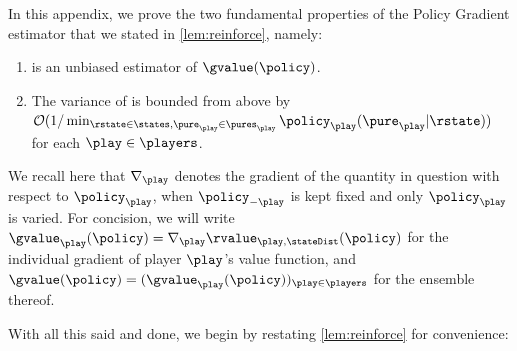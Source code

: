 

In this appendix, we prove the two fundamental properties of the \reinforce Policy Gradient estimator that we stated in \cref{lem:reinforce}, namely:
\begin{enumerate}
\item
\reinforce is an unbiased estimator of $\gvalue(\policy)$.
\item
The variance of \reinforce is bounded from above by $\bigoh\parens{1/\min_{\rstate\in\states,\pure_{\play}\in\pures_{\play}} \policy_\play(\pure_\play \vert \rstate)}$ for each $\play\in\players$.
\end{enumerate}

We recall here that $\nabla_{\play}$ denotes the gradient of the quantity in question with respect to $\policy_{\play}$, \ie when $\policy_{-\play}$ is kept fixed and only $\policy_{\play}$ is varied. 
For concision, we will write $\gvalue_{\play}(\policy) = \nabla_{\play} \rvalue_{\play,\stateDist}(\policy)$ for the individual gradient of player $\play$'s value function, and $\gvalue(\policy) = (\gvalue_{\play}(\policy))_{\play\in\players}$ for the ensemble thereof.

With all this said and done, we begin by restating \cref{lem:reinforce} for convenience:


